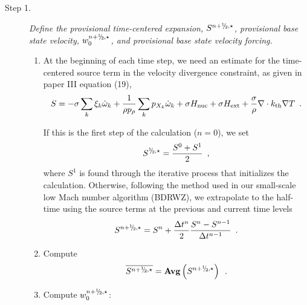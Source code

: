 \begin{description}

\item[Step 1.] {\em Define the provisional time-centered expansion, $S^{n+\myhalf,\star}$, 
provisional base state velocity, $w_0^{n+\myhalf,\star}$, and provisional base state velocity 
forcing.}

\begin{enumerate}
\renewcommand{\theenumi}{{\bf \alph{enumi}}}

\item At the beginning of each time step, we need an estimate for the time-centered
source term in the velocity divergence constraint, as given in paper III equation (19),
\begin{equation}
  S =  -\sigma  \sum_k  \xi_k \dot{\omega}_k  + 
  \frac{1}{\rho p_\rho} \sum_k p_{X_k}  {\dot{\omega}}_k  + \sigma {H_{\rm nuc}} + \sigma {H_{\rm ext}} 
  + \frac{\sigma}{\rho}\nabla\cdot k_{\rm th}\nabla T \enskip .
\label{eq:defineS} 
\end{equation}

If this is the first step of the calculation ($n=0$), we set
\begin{equation}
S^{\myhalf,\star} = \frac{S^0 + S^1}{2} \enskip ,
\end{equation}
where $S^1$ is found through the iterative process that initializes the calculation.
Otherwise, following the method used in our small-scale low Mach number algorithm
(BDRWZ), we extrapolate to the half-time using the source
terms at the previous and current time levels
\begin{equation}
S^{\nph,\star} = S^n + \frac{\Delta t^n}{2} \frac{S^n - S^{n-1}}{\Delta t^{n-1}} \enskip .
\end{equation}
\item Compute
\begin{equation}
\overline{S^{\nph,\star}} = {\mathrm{\bf Avg}} \left(S^{\nph,\star}\right) \enskip .
\end{equation}
\item Compute $w_0^{n+\myhalf,\star}$:


\end{enumerate}
\end{description}
